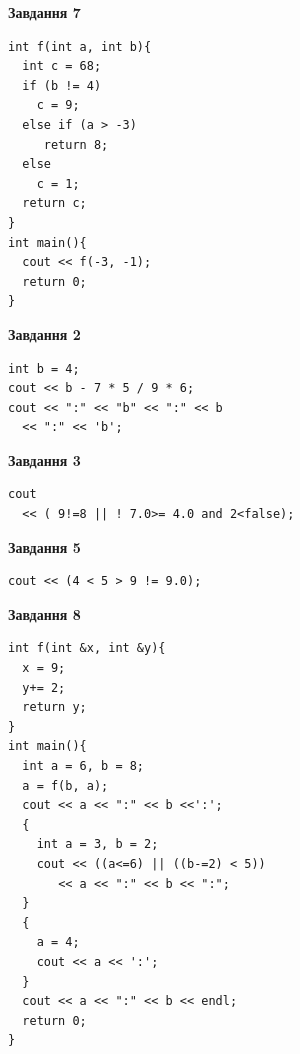 \documentclass[12pt, ukrainian]{article}
\begin{document}
{\begin {large}
\begin{minipage}[t]{7.0cm}
\begin{center}
\textbf{Завдання 7}
\end{center}
\vspace{-8mm}

\begin{verbatim}
int f(int a, int b){
  int c = 68;
  if (b != 4)
    c = 9;
  else if (a > -3)
     return 8;
  else
    c = 1;
  return c;
}
int main(){
  cout << f(-3, -1);
  return 0;
}
\end{verbatim}

\end{minipage}
\vline \hspace{1mm}
\begin{minipage}[t]{11.0cm}

\begin{center}
\textbf{Завдання 2}
\end{center}
\vspace{-8mm}

\begin{verbatim}
int b = 4;
cout << b - 7 * 5 / 9 * 6;
cout << ":" << "b" << ":" << b 
  << ":" << 'b';
\end{verbatim}



\begin{center}
\textbf{Завдання 3}
\end{center}
\vspace{-8mm}

\begin{verbatim}
cout 
  << ( 9!=8 || ! 7.0>= 4.0 and 2<false);
\end{verbatim}



\begin{center}
\textbf{Завдання 5}
\end{center}
\vspace{-8mm}

\begin{verbatim}
cout << (4 < 5 > 9 != 9.0);
\end{verbatim}



\begin{center}
\textbf{Завдання 8}
\end{center}
\vspace{-8mm}

\begin{verbatim}
int f(int &x, int &y){
  x = 9;
  y+= 2;
  return y;
}
int main(){
  int a = 6, b = 8;
  a = f(b, a);
  cout << a << ":" << b <<':';
  {
    int a = 3, b = 2;
    cout << ((a<=6) || ((b-=2) < 5))
       << a << ":" << b << ":";
  }
  {
    a = 4;
    cout << a << ':';
  }
  cout << a << ":" << b << endl;
  return 0;
}
\end{verbatim}


\end{minipage}
\end{large}}
\end{document}
